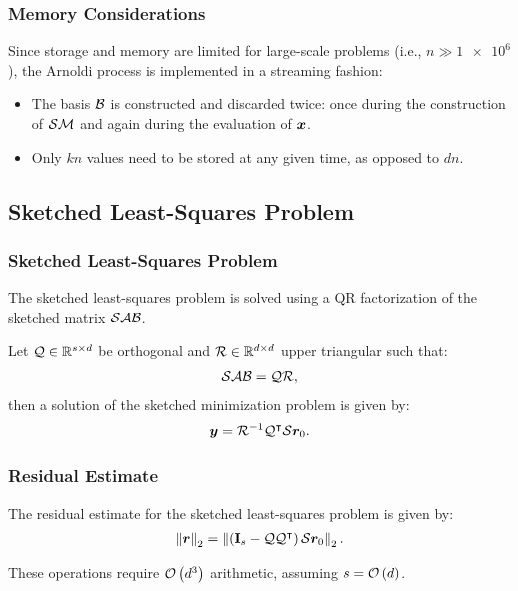 \begin{frame}
    \frametitle{Memory Considerations}

    Since storage and memory are limited for large-scale problems (i.e., $n \gg \num{1e6}$), the Arnoldi process is implemented in a streaming fashion:
    \begin{itemize}
        \item The basis $\mathcal{B}$ is constructed and discarded twice: once during the construction of $\mathcal{S} \mathcal{M}$ and again during the evaluation of $\bm{x}$.
        \item Only $k n$ values need to be stored at any given time, as opposed to $d n$.
    \end{itemize}
\end{frame}

\subsection{Sketched Least-Squares Problem}

\begin{frame}
    \frametitle{Sketched Least-Squares Problem}

    The sketched least-squares problem is solved using a QR factorization of the sketched matrix $\mathcal{S} \mathcal{A} \mathcal{B}$.

    Let $\mathcal{Q} \in \mathbb{R}^{s \times d}$ be orthogonal and $\mathcal{R} \in \mathbb{R}^{d \times d}$ upper triangular such that:
    \begin{align}
        \mathcal{S} \mathcal{A} \mathcal{B} = \mathcal{Q} \mathcal{R},
    \end{align}
    then a solution of the sketched minimization problem is given by:
    \begin{align}
        \bm{y} = \mathcal{R}^{-1} \mathcal{Q}^{\intercal} \mathcal{S} \bm{r}_0.
    \end{align}
\end{frame}

\begin{frame}
    \frametitle{Residual Estimate}

    The residual estimate for the sketched least-squares problem is given by:
    \begin{align}
        \left\lVert \bm{r} \right\rVert_2 = \left\lVert  \left( \mathbf{I}_s - \mathcal{Q} \mathcal{Q}^{\intercal} \right) \mathcal{S} \bm{r}_0  \right\rVert_2.
    \end{align}
    
    These operations require $\mathcal{O} \left( d^3 \right)$ arithmetic, assuming $s = \mathcal{O} \left( d \right)$.
\end{frame}

